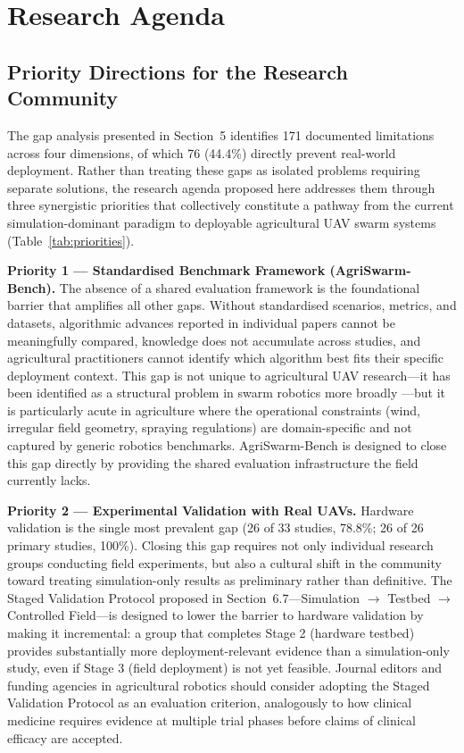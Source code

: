 \documentclass[review,3p,times]{elsarticle}
\begin{document}
\section{Research Agenda}

\subsection{Priority Directions for the Research Community}

The gap analysis presented in Section~5 identifies 171 documented limitations across four dimensions, of which 76 (44.4\%) directly prevent real-world deployment. Rather than treating these gaps as isolated problems requiring separate solutions, the research agenda proposed here addresses them through three synergistic priorities that collectively constitute a pathway from the current simulation-dominant paradigm to deployable agricultural UAV swarm systems (Table~\ref{tab:priorities}).

\textbf{Priority 1 --- Standardised Benchmark Framework (AgriSwarm-Bench).} The absence of a shared evaluation framework is the foundational barrier that amplifies all other gaps. Without standardised scenarios, metrics, and datasets, algorithmic advances reported in individual papers cannot be meaningfully compared, knowledge does not accumulate across studies, and agricultural practitioners cannot identify which algorithm best fits their specific deployment context. This gap is not unique to agricultural UAV research---it has been identified as a structural problem in swarm robotics more broadly \cite{brambilla2013}---but it is particularly acute in agriculture where the operational constraints (wind, irregular field geometry, spraying regulations) are domain-specific and not captured by generic robotics benchmarks. AgriSwarm-Bench is designed to close this gap directly by providing the shared evaluation infrastructure the field currently lacks.

\textbf{Priority 2 --- Experimental Validation with Real UAVs.} Hardware validation is the single most prevalent gap (26 of 33 studies, 78.8\%; 26 of 26 primary studies, 100\%). Closing this gap requires not only individual research groups conducting field experiments, but also a cultural shift in the community toward treating simulation-only results as preliminary rather than definitive. The Staged Validation Protocol proposed in Section~6.7---Simulation $\rightarrow$ Testbed $\rightarrow$ Controlled Field---is designed to lower the barrier to hardware validation by making it incremental: a group that completes Stage 2 (hardware testbed) provides substantially more deployment-relevant evidence than a simulation-only study, even if Stage 3 (field deployment) is not yet feasible. Journal editors and funding agencies in agricultural robotics should consider adopting the Staged Validation Protocol as an evaluation criterion, analogously to how clinical medicine requires evidence at multiple trial phases before claims of clinical efficacy are accepted.
\end{document}
